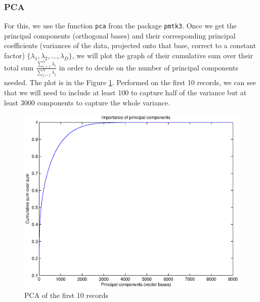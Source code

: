 \subsubsection{PCA}
	For this, we use the function \verb!pca! from the package \verb!pmtk3!. Once we get the principal components (orthogonal bases) and their corresponding principal coefficients (variances of the data, projected onto that base, correct to a constant factor) $\{\lambda_1, \lambda_2, \dotsc, \lambda_D\}$, we will plot the graph of their cumulative sum over their total sum $\frac{\sum_{i = 1}^n \lambda_i}{\sum_{j = 1}^N \lambda_j}$ in order to decide on the number of principal components needed. The plot is in the Figure \ref{fig:visualisePca}. Performed on the first 10 records, we can see that we will need to include at least 100 to capture half of the variance but at least 3000 components to capture the whole variance.
	\begin{figure}[ht!]
		\centering
			\includegraphics[width=.5\textwidth]{drawings/visualisePca.eps}
		\caption{PCA of the first 10 records}
		\label{fig:visualisePca}
	\end{figure}
